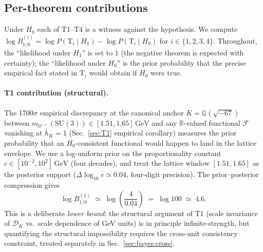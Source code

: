 \documentclass[aps,prl,reprint,superscriptaddress,floatfix,nofootinbib,amssymb]{revtex4-2}
\theoremstyle{definition}
\theoremstyle{remark}
\newcommand{\Q}{\mathbb{Q}}
\newcommand{\R}{\mathbb{R}}
\begin{document}
\subsection{Per-theorem contributions}\label{sec:bayes:per-thm}

Under $H_0$ each of T1--T4 is a witness against the hypothesis. We
compute $\log B^{(i)}_{1/0} = \log P(\text{T}_i \mid H_1) -
\log P(\text{T}_i \mid H_0)$ for $i\in\{1,2,3,4\}$. Throughout, the
``likelihood under $H_1$'' is set to $1$ (the negative theorem is
expected with certainty); the ``likelihood under $H_0$'' is the
prior probability that the precise empirical fact stated in $\text{T}_i$
would obtain if $H_0$ were true.

\paragraph{T1 contribution (structural).} The 1700$\sigma$ empirical
discrepancy at the canonical anchor $K=\Q(\sqrt{-67})$ between
$m_{0^{++}}(\mathrm{SU}(3)) \in [1.51, 1.65]\,\mathrm{GeV}$ and any
$\R$-valued functional $\mathcal F$ vanishing at $h_K=1$
(Sec.~\ref{sec:T1} empirical corollary) measures the prior probability
that an $H_0$-consistent functional would happen to land in
the lattice envelope. We use a log-uniform prior on the proportionality
constant $c \in [10^{-2}, 10^{2}]\,\mathrm{GeV}$ (four decades), and
treat the lattice window $[1.51, 1.65]$ as the posterior support
($\Delta \log_{10} c \simeq 0.04$, four-digit precision). The
prior--posterior compression gives
\begin{equation}\label{eq:logBT1}
\log B^{(1)}_{1/0} \;\simeq\; \log\!\left(\frac{4}{0.04}\right)
\;=\; \log 100 \;\simeq\; 4.6.
\end{equation}
This is a deliberate \emph{lower bound}: the structural argument of
T1 (scale invariance of $\mathcal D_K$ vs.\ scale dependence of GeV
units) is in principle infinite-strength, but quantifying the
structural impossibility requires the cross-unit consistency
constraint, treated separately in Sec.~\ref{sec:bayes:cross}.
\end{document}
